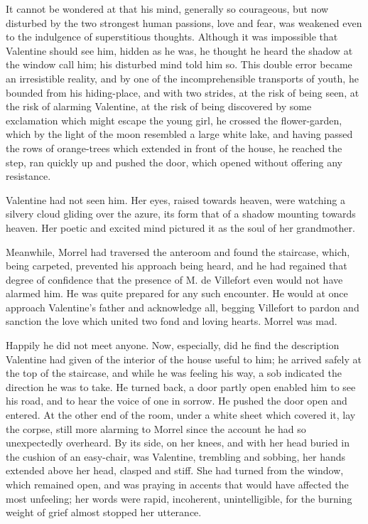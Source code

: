  It cannot be wondered at that his mind, generally so courageous, but now disturbed by the two strongest human passions, love and fear, was weakened even to the indulgence of superstitious thoughts. Although it was impossible that Valentine should see him, hidden as he was, he thought he heard the shadow at the window call him; his disturbed mind told him so. This double error became an irresistible reality, and by one of the incomprehensible transports of youth, he bounded from his hiding-place, and with two strides, at the risk of being seen, at the risk of alarming Valentine, at the risk of being discovered by some exclamation which might escape the young girl, he crossed the flower-garden, which by the light of the moon resembled a large white lake, and having passed the rows of orange-trees which extended in front of the house, he reached the step, ran quickly up and pushed the door, which opened without offering any resistance. 

 Valentine had not seen him. Her eyes, raised towards heaven, were watching a silvery cloud gliding over the azure, its form that of a shadow mounting towards heaven. Her poetic and excited mind pictured it as the soul of her grandmother. 

 Meanwhile, Morrel had traversed the anteroom and found the staircase, which, being carpeted, prevented his approach being heard, and he had regained that degree of confidence that the presence of M. de Villefort even would not have alarmed him. He was quite prepared for any such encounter. He would at once approach Valentine's father and acknowledge all, begging Villefort to pardon and sanction the love which united two fond and loving hearts. Morrel was mad. 

 Happily he did not meet anyone. Now, especially, did he find the description Valentine had given of the interior of the house useful to him; he arrived safely at the top of the staircase, and while he was feeling his way, a sob indicated the direction he was to take. He turned back, a door partly open enabled him to see his road, and to hear the voice of one in sorrow. He pushed the door open and entered. At the other end of the room, under a white sheet which covered it, lay the corpse, still more alarming to Morrel since the account he had so unexpectedly overheard. By its side, on her knees, and with her head buried in the cushion of an easy-chair, was Valentine, trembling and sobbing, her hands extended above her head, clasped and stiff. She had turned from the window, which remained open, and was praying in accents that would have affected the most unfeeling; her words were rapid, incoherent, unintelligible, for the burning weight of grief almost stopped her utterance. 

